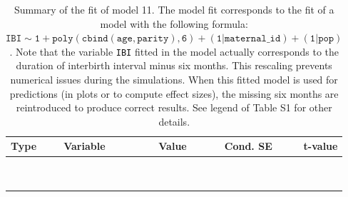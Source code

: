 \begin{table}

\caption{\label{tab:tab11}Summary of the fit of model 11. The model fit corresponds to the fit of a model with the following formula: {\small$\mathtt{IBI \sim 1 + poly(cbind(age, parity), 6) + (1 | maternal\_id) + (1 | pop)}$}. Note that the variable \texttt{IBI} fitted in the model actually corresponds to the duration of interbirth interval minus six months. This rescaling prevents numerical issues during the simulations. When this fitted model is used for predictions (in plots or to compute effect sizes), the missing six months are reintroduced to produce correct results. See legend of Table S1 for other details.}
\centering
\fontsize{8}{10}\selectfont
\begin{tabular}[t]{>{\raggedright\arraybackslash}p{3cm}>{\raggedright\arraybackslash}p{5cm}rrr}
\toprule
Type & Variable & Value & Cond. SE & t-value\\
\midrule
\cellcolor{gray!6}{fixed effects} & \cellcolor{gray!6}{$\beta_1$} & \cellcolor{gray!6}{3.44} & \cellcolor{gray!6}{0.0583} & \cellcolor{gray!6}{59}\\
\cellcolor{gray!6}{} & \cellcolor{gray!6}{$\beta_{\mathtt{age}}$} & \cellcolor{gray!6}{-63.4} & \cellcolor{gray!6}{21.9} & \cellcolor{gray!6}{-2.9}\\
\cellcolor{gray!6}{} & \cellcolor{gray!6}{$\beta_{\mathtt{age}^2}$} & \cellcolor{gray!6}{39.5} & \cellcolor{gray!6}{19.6} & \cellcolor{gray!6}{2.01}\\
\cellcolor{gray!6}{} & \cellcolor{gray!6}{$\beta_{\mathtt{age}^3}$} & \cellcolor{gray!6}{-31.2} & \cellcolor{gray!6}{13} & \cellcolor{gray!6}{-2.4}\\
\cellcolor{gray!6}{} & \cellcolor{gray!6}{$\beta_{\mathtt{age}^4}$} & \cellcolor{gray!6}{14.9} & \cellcolor{gray!6}{6.31} & \cellcolor{gray!6}{2.37}\\
\cellcolor{gray!6}{} & \cellcolor{gray!6}{$\beta_{\mathtt{age}^5}$} & \cellcolor{gray!6}{-4.98} & \cellcolor{gray!6}{2.42} & \cellcolor{gray!6}{-2.06}\\
\cellcolor{gray!6}{} & \cellcolor{gray!6}{$\beta_{\mathtt{age}^6}$} & \cellcolor{gray!6}{4.01} & \cellcolor{gray!6}{1.01} & \cellcolor{gray!6}{3.95}\\
\cellcolor{gray!6}{} & \cellcolor{gray!6}{$\beta_{\mathtt{parity}}$} & \cellcolor{gray!6}{120} & \cellcolor{gray!6}{40.7} & \cellcolor{gray!6}{2.96}\\
\cellcolor{gray!6}{} & \cellcolor{gray!6}{$\beta_{\mathtt{age}\times\mathtt{parity}}$} & \cellcolor{gray!6}{-29652} & \cellcolor{gray!6}{15604} & \cellcolor{gray!6}{-1.9}\\

\end{tabular}
\end{table}
